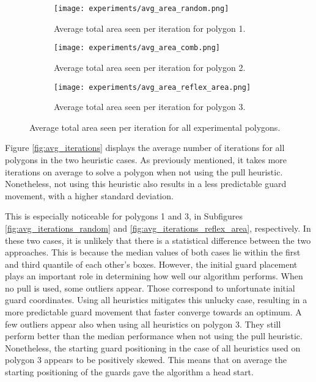 \begin{figure}[h!]
    \centering
    \begin{subfigure}{0.45\textwidth}
        \texttt{[image: experiments/avg\_area\_random.png]}
        \caption{Average total area seen per iteration for polygon 1.}
        \label{fig:avg_area_random}
    \end{subfigure}
    \hfill
    \begin{subfigure}{0.45\textwidth}
        \texttt{[image: experiments/avg\_area\_comb.png]}
        \caption{Average total area seen per iteration for polygon 2.}
        \label{fig:avg_area_comb}
    \end{subfigure}
    \begin{subfigure}{0.5\textwidth}
        \texttt{[image: experiments/avg\_area\_reflex\_area.png]}
        \caption{Average total area seen per iteration for polygon 3.}
        \label{fig:avg_area_reflex_area}
    \end{subfigure}
    \caption{Average total area seen per iteration for all experimental polygons.}
    \label{fig:avg_area}
\end{figure}

\newpage
Figure \ref{fig:avg_iterations} displays the average number of iterations for all polygons in the two heuristic cases. As previously mentioned, it takes more iterations on average to solve a polygon when not using the pull heuristic. Nonetheless, not using this heuristic also results in a less predictable guard movement, with a higher standard deviation.

This is especially noticeable for polygons 1 and 3, in Subfigures \ref{fig:avg_iterations_random} and \ref{fig:avg_iterations_reflex_area}, respectively. In these two cases, it is unlikely that there is a statistical difference between the two approaches. This is because the median values of both cases lie within the first and third quantile of each other's boxes. However, the initial guard placement plays an important role in determining how well our algorithm performs. When no pull is used, some outliers appear. Those correspond to unfortunate initial guard coordinates. Using all heuristics mitigates this unlucky case, resulting in a more predictable guard movement that faster converge towards an optimum. A few outliers appear also when using all heuristics on polygon 3. They still perform better than the median performance when not using the pull heuristic. Nonetheless, the starting guard positioning in the case of all heuristics used on polygon 3 appears to be positively skewed. This means that on average the starting positioning of the guards gave the algorithm a head start.

